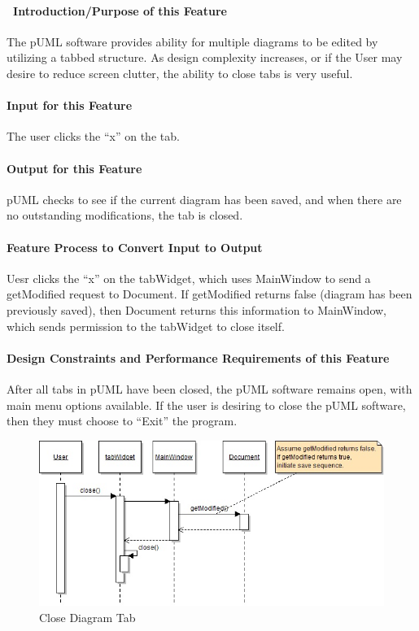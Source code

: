 \documentclass[twoside,letterpaper]{article}
\begin{document}
{\paragraph[\ Introduction/Purpose of this Feature]
{\ Introduction/Purpose of this Feature}
{
The pUML software provides ability for multiple diagrams to be edited by utilizing a tabbed structure. As design complexity increases, or if the User may desire to reduce screen clutter, the ability to close tabs is very useful.
}

\paragraph[Input for this Feature]{Input for this Feature}
{
The user clicks the ``x'' on the tab.
}

\paragraph{Output for this Feature}
{
pUML checks to see if the current diagram has been saved, and when there are no outstanding modifications, the tab is closed.
}

\paragraph{Feature Process to Convert Input to Output}
{
Uesr clicks the ``x'' on the tabWidget, which uses MainWindow to send a getModified request to Document. If getModified returns false (diagram has been previously saved), then Document returns this information to MainWindow, which sends permission to the tabWidget to close itself.
}

\paragraph{Design Constraints and Performance Requirements of this Feature}
{
After all tabs in pUML have been closed, the pUML software remains open, with main menu options available. If the user is desiring to close the pUML software, then they must choose to ``Exit'' the program.
}
\bigskip

\begin{figure}[h]
\centering
\includegraphics[width=6.0in]{IntCloseTab.jpg}
\caption{Close Diagram Tab}
\end{figure}

}
\end{document}
